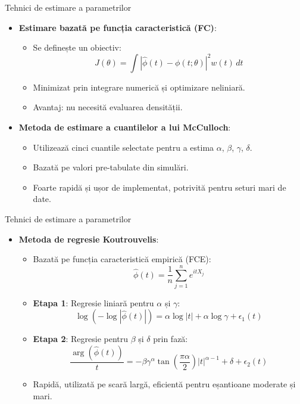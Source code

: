 \documentclass[9pt, aspectratio=169, t]{beamer}
\theoremstyle{definition}
\begin{document}
\begin{frame}{Tehnici de estimare a parametrilor}
\begin{itemize}
    \item \textbf{Estimare bazată pe funcția caracteristică (FC)}:
    \begin{itemize}
        \item Se definește un obiectiv:
        \[
            J(\theta) = \int |\hat\phi(t) - \phi(t;\theta)|^2 w(t)\,dt
        \]
        \item Minimizat prin integrare numerică și optimizare neliniară.
        \item Avantaj: nu necesită evaluarea densității.
    \end{itemize}
    \item \textbf{Metoda de estimare a cuantilelor a lui McCulloch}:
    \begin{itemize}
        \item Utilizează cinci cuantile selectate pentru a estima $\alpha$, $\beta$, $\gamma$, $\delta$.
        \item Bazată pe valori pre-tabulate din simulări.
        \item Foarte rapidă și ușor de implementat, potrivită pentru seturi mari de date.
    \end{itemize}
\end{itemize}
\end{frame}

\begin{frame}{Tehnici de estimare a parametrilor}
\begin{itemize}
    \item \textbf{Metoda de regresie Koutrouvelis}:
    \begin{itemize}
        \item Bazată pe funcția caracteristică empirică (FCE):
        \[
            \hat\phi(t) = \frac{1}{n}\sum_{j=1}^n e^{itX_j}
        \]
        \item \textbf{Etapa 1}: Regresie liniară pentru $\alpha$ și $\gamma$:
        \[
            \log(-\log|\hat\phi(t)|) = \alpha\log|t| + \alpha\log\gamma + \epsilon_1(t)
        \]
        \item \textbf{Etapa 2}: Regresie pentru $\beta$ și $\delta$ prin fază:
        \[
            \frac{\arg(\hat\phi(t))}{t} = -\beta\gamma^\alpha\tan\left(\frac{\pi\alpha}{2}\right)|t|^{\alpha-1} + \delta + \epsilon_2(t)
        \]
        \item Rapidă, utilizată pe scară largă, eficientă pentru eșantioane moderate și mari.
    \end{itemize}
\end{itemize}
\end{frame}
\end{document}
